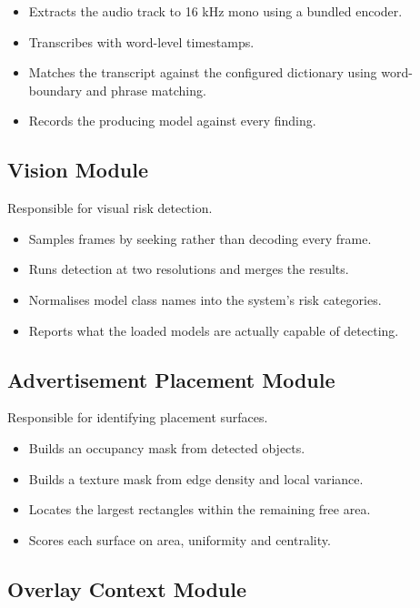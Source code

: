 \documentclass[12pt,a4paper,twoside]{report}
\begin{document}
\begin{itemize}
\item Extracts the audio track to 16 kHz mono using a bundled encoder.
\item Transcribes with word-level timestamps.
\item Matches the transcript against the configured dictionary using word-boundary and phrase matching.
\item Records the producing model against every finding.
\end{itemize}

\subsection{Vision Module}

Responsible for visual risk detection.

\begin{itemize}
\item Samples frames by seeking rather than decoding every frame.
\item Runs detection at two resolutions and merges the results.
\item Normalises model class names into the system's risk categories.
\item Reports what the loaded models are actually capable of detecting.
\end{itemize}

\subsection{Advertisement Placement Module}

Responsible for identifying placement surfaces.

\begin{itemize}
\item Builds an occupancy mask from detected objects.
\item Builds a texture mask from edge density and local variance.
\item Locates the largest rectangles within the remaining free area.
\item Scores each surface on area, uniformity and centrality.
\end{itemize}

\subsection{Overlay Context Module}
\end{document}
